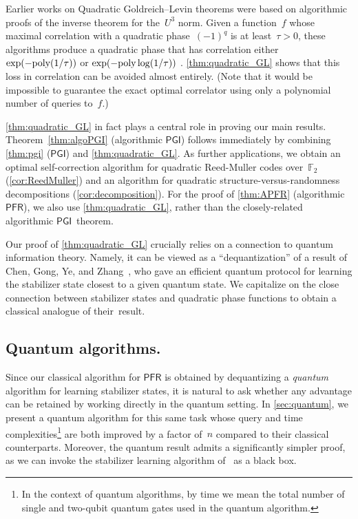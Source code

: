 \documentclass[11pt]{amsart}
\newcommand{\F}{\mathbb{F}} %
\newcommand{\PFR}{\textsf{PFR}}
\newcommand{\PGI}{\textsf{PGI}}
\newcommand{\poly}{\mbox{\rm poly}}
\theoremstyle{plain}
\theoremstyle{definition}
\theoremstyle{remark}
\begin{document}
Earlier works on Quadratic Goldreich--Levin theorems were based on algorithmic proofs of the inverse theorem for the~$U^3$ norm.
Given a function~$f$ whose maximal correlation with a quadratic phase~$(-1)^q$ is at least~$\tau>0$, these algorithms produce a quadratic phase that has correlation either $\exp(-\poly(1/\tau))$ \cite{TulsianiW2014} or $\exp(-\poly\log(1/\tau))$ \cite{ben2014sampling}.
\cref{thm:quadratic_GL} shows that this loss in correlation can be avoided almost entirely.
(Note that it would be impossible to guarantee the exact optimal correlator using only a polynomial number of queries to~$f$.)

\cref{thm:quadratic_GL} in fact plays a central role in proving our main results.
Theorem~\ref{thm:algoPGI} (algorithmic $\PGI$)  follows immediately by combining \cref{thm:pgi} ($\PGI$) and \cref{thm:quadratic_GL}.
As further applications, we obtain an optimal self-correction algorithm for quadratic Reed-Muller codes over~$\F_2$ (\cref{cor:ReedMuller}) and an algorithm for quadratic structure-versus-randomness decompositions (\cref{cor:decomposition}).
For the proof of \cref{thm:APFR} (algorithmic $\PFR$), we  also use \cref{thm:quadratic_GL}, rather than the closely-related algorithmic $\PGI$~theorem.

Our proof of \cref{thm:quadratic_GL} crucially relies on a connection to quantum information theory.
Namely, it can be viewed as a ``dequantization'' of a result of Chen, Gong, Ye, and Zhang~\cite{chen2024stabilizer}, who gave an efficient quantum protocol for learning the stabilizer state closest to a given quantum state. We capitalize on the close connection between stabilizer states and quadratic phase functions to obtain a classical analogue of their~result.


\subsection{Quantum algorithms.}

Since our classical algorithm for $\PFR$ is obtained by dequantizing a \emph{quantum} algorithm for learning stabilizer states, it is natural to ask whether any advantage can be retained by working directly in the quantum setting. 
In \cref{sec:quantum}, we present a quantum algorithm for this same task whose query and time complexities\footnote{In the context of quantum algorithms, by time we mean the total number of single and two-qubit quantum gates used in the quantum algorithm.} are both improved by a factor of~$n$ compared to their classical counterparts.
Moreover, the quantum result admits a significantly simpler proof, as we can invoke the stabilizer learning algorithm of~\cite{chen2024stabilizer} as a black box.
\end{document}
